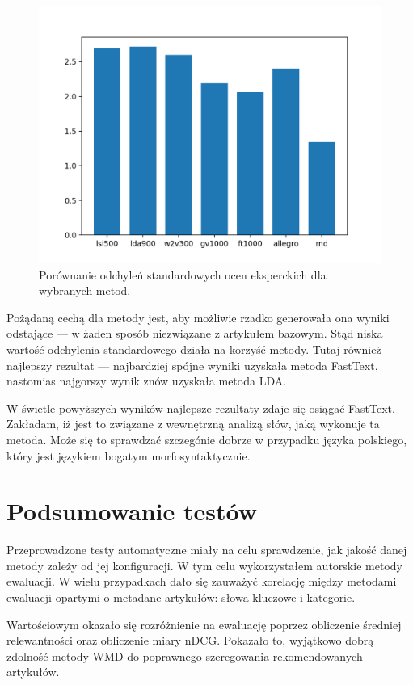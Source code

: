 \documentclass[pl]{minipw} %
\begin{document}
\begin{figure}[H]
	\centering
	\includegraphics[width=1\textwidth]{img/results/lsi500_lda900_w2v300_gv1000_ft1000_allegro_rnd_users_std.png}
	\caption{Porównanie odchyleń standardowych ocen eksperckich dla wybranych metod.}
\end{figure}

Pożądaną cechą dla metody jest, aby możliwie rzadko generowała ona wyniki odstające --- w żaden sposób niezwiązane z artykułem bazowym. Stąd niska wartość odchylenia standardowego działa na korzyść metody. Tutaj również najlepszy rezultat --- najbardziej spójne wyniki uzyskała metoda FastText, nastomias najgorszy wynik znów uzyskała metoda LDA.

W świetle powyższych wyników najlepsze rezultaty zdaje się osiągać FastText. Zakładam, iż jest to związane z wewnętrzną analizą słów, jaką wykonuje ta metoda. Może się to sprawdzać szczegónie dobrze w przypadku języka polskiego, który jest językiem bogatym morfosyntaktycznie.

\section{Podsumowanie testów}

Przeprowadzone testy automatyczne miały na celu sprawdzenie, jak jakość danej metody zależy od jej konfiguracji. W tym celu wykorzystałem autorskie metody ewaluacji. W wielu przypadkach dało się zauważyć korelację między metodami ewaluacji opartymi o metadane artykułów: słowa kluczowe i kategorie.

Wartościowym okazało się rozróżnienie na ewaluację poprzez obliczenie średniej relewantności oraz obliczenie miary nDCG. Pokazało to, wyjątkowo dobrą zdolność metody WMD do poprawnego szeregowania rekomendowanych artykułów.
\end{document}
